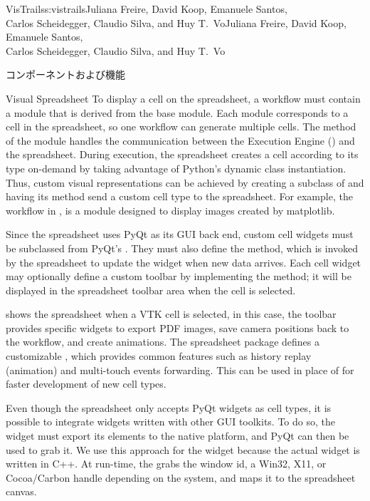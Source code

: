 \begin{aosachaptertoc}{VisTrails}{s:vistrails}{Juliana Freire, David Koop, Emanuele Santos, \\ Carlos Scheidegger, Claudio Silva, and Huy T.\ Vo}{Juliana Freire, David Koop, Emanuele Santos, \\ \hspace*{0.9cm} Carlos Scheidegger, Claudio Silva, and Huy T.\ Vo}
\begin{aosasect1}{コンポーネントおよび機能}
\begin{aosasect2}{Visual Spreadsheet}
To display a cell on the spreadsheet, a workflow must contain a module
that is derived from the base  module.  Each
 module corresponds to a cell in the
spreadsheet, so one workflow can generate multiple cells.  The
 method of the  module handles the
communication between the Execution Engine
() and the spreadsheet.  During
execution, the spreadsheet creates a cell according to its type
on-demand by taking advantage of Python's dynamic class instantiation.
Thus, custom visual representations can be achieved by creating a
subclass of  and having its 
method send a custom cell type to the spreadsheet. For example, the
workflow in , 
is a  module designed to display images created
by matplotlib.

Since the spreadsheet uses PyQt as its GUI back end, custom cell
widgets must be subclassed from PyQt's .  They must also
define the  method, which is invoked by the
spreadsheet to update the widget when new data arrives. Each cell
widget may optionally define a custom toolbar by implementing the
 method; it will be displayed in the spreadsheet
toolbar area when the cell is selected.

 shows the spreadsheet when a
VTK cell is selected, in this case, the toolbar provides specific
widgets to export PDF images, save camera positions back to the
workflow, and create animations.  The spreadsheet package defines a
customizable , which provides common features such
as history replay (animation) and multi-touch events forwarding. This
can be used in place of  for faster development of new
cell types.

Even though the spreadsheet only accepts PyQt widgets as cell types,
it is possible to integrate widgets written with other GUI toolkits.
To do so, the widget must export its elements to the native platform,
and PyQt can then be used to grab it. We use this approach for the
 widget because the actual widget is written in C++. At
run-time, the  grabs the window id, a Win32, X11, or
Cocoa/Carbon handle depending on the system, and maps it to the
spreadsheet canvas.


\end{aosasect2}
\end{aosasect1}
\end{aosachaptertoc}
